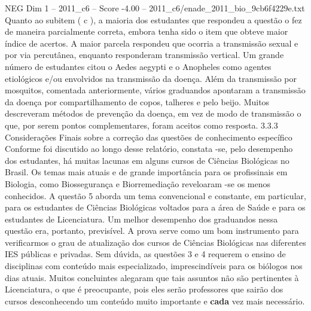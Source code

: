 \begin{textsample}{NEG Dim 1 – 2011\_c6 – Score -4.00 – 2011\_c6/enade\_2011\_bio\_9cb6f4229e.txt}
Quanto ao subitem ( c ), a maioria dos estudantes que respondeu a questão o fez de maneira parcialmente correta, embora tenha sido o item que obteve maior índice de acertos.
A maior parcela respondeu que ocorria a transmissão sexual e por via percutânea, enquanto responderam transmissão vertical.
Um grande número de estudantes citou o Aedes aegypti e o Anopheles como agentes etiológicos e/ou envolvidos na transmissão da doença.
Além da transmissão por mosquitos, comentada anteriormente, vários graduandos apontaram a transmissão da doença por compartilhamento de copos, talheres e pelo beijo.
Muitos descreveram métodos de prevenção da doença, em vez de modo de transmissão o que, por serem pontos complementares, foram aceitos como resposta. 3.3.3 Considerações Finais sobre a correção das questões de conhecimento específico Conforme foi discutido ao longo desse relatório, constata -se, pelo desempenho dos estudantes, há muitas lacunas em alguns cursos de Ciências Biológicas no Brasil.
Os temas mais atuais e de grande importância para os profissinais em Biologia, como Biossegurança e Biorremediação reveloaram -se os menos conhecidos.
A questão 5 aborda um tema convencional e constante, em particular, para os estudantes de Ciências Biológicas voltados para a área de Saúde e para os estudantes de Licenciatura.
Um melhor desempenho dos graduandos nessa questão era, portanto, previsível.
A prova serve como um bom instrumento para verificarmos o grau de atualização dos cursos de Ciências Biológicas nas diferentes IES públicas e privadas.
Sem dúvida, as questões 3 e 4 requerem o ensino de disciplinas com conteúdo mais especializado, imprescindíveis para os biólogos nos dias atuais.
Muitos concluintes alegaram que tais assuntos não são pertinentes à Licenciatura, o que é preocupante, pois eles serão professores que sairão dos cursos desconhecendo um conteúdo muito importante e \textbf{cada} vez mais necessário.

\end{textsample}
